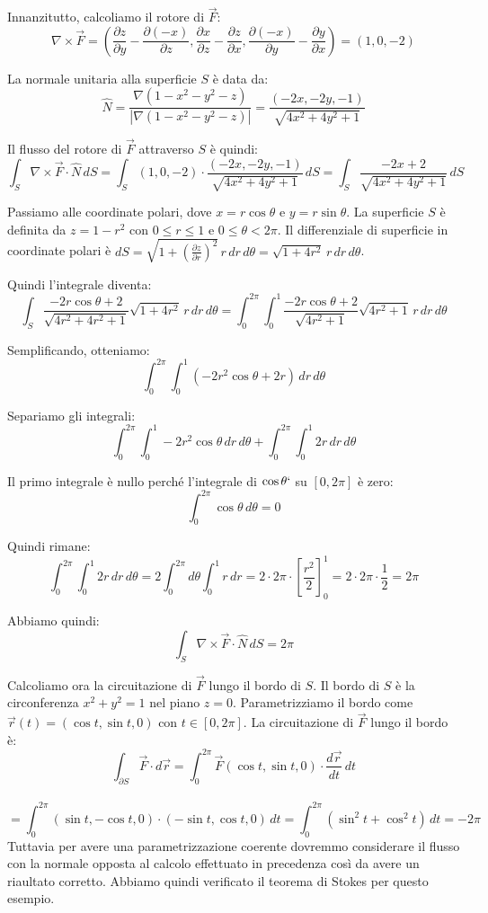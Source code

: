 Innanzitutto, calcoliamo il rotore di $\vec{F}$:
\[
\nabla \times \vec{F} = \left( \frac{\partial z}{\partial y} - \frac{\partial (-x)}{\partial z}, \frac{\partial x}{\partial z} - \frac{\partial z}{\partial x}, \frac{\partial (-x)}{\partial y} - \frac{\partial y}{\partial x} \right) = (1, 0, -2)
\]

La normale unitaria alla superficie $S$ è data da:
\[
\hat{N} = \frac{\nabla (1 - x^2 - y^2 - z)}{|\nabla (1 - x^2 - y^2 - z)|} = \frac{(-2x, -2y, -1)}{\sqrt{4x^2 + 4y^2 + 1}}
\]

Il flusso del rotore di $\vec{F}$ attraverso $S$ è quindi:
\[
\int_S \nabla \times \vec{F} \cdot \hat{N} \, dS = \int_S (1, 0, -2) \cdot \frac{(-2x, -2y, -1)}{\sqrt{4x^2 + 4y^2 + 1}} \, dS = \int_S \frac{-2x + 2}{\sqrt{4x^2 + 4y^2 + 1}} \, dS
\]

Passiamo alle coordinate polari, dove $x = r \cos \theta$ e $y = r \sin \theta$. La superficie $S$ è definita da $z = 1 - r^2$ con $0 \leq r \leq 1$ e $0 \leq \theta < 2\pi$. Il differenziale di superficie in coordinate polari è $dS = \sqrt{1 + (\frac{\partial z}{\partial r})^2} \, r \, dr \, d\theta = \sqrt{1 + 4r^2} \, r \, dr \, d\theta$.

Quindi l'integrale diventa:
\[
\int_S \frac{-2r \cos \theta + 2}{\sqrt{4r^2 + 4r^2 + 1}} \sqrt{1 + 4r^2} \, r \, dr \, d\theta = \int_0^{2\pi} \int_0^1 \frac{-2r \cos \theta + 2}{\sqrt{4r^2 + 1}} \sqrt{4r^2 + 1} \, r \, dr \, d\theta
\]

Semplificando, otteniamo:
\[
\int_0^{2\pi} \int_0^1 (-2r^2 \cos \theta + 2r) \, dr \, d\theta
\]

Separiamo gli integrali:
\[
\int_0^{2\pi} \int_0^1 -2r^2 \cos \theta \, dr \, d\theta + \int_0^{2\pi} \int_0^1 2r \, dr \, d\theta
\]

Il primo integrale è nullo perché l'integrale di $\cos \theta`$ su $[0, 2\pi]$ è zero:
\[
\int_0^{2\pi} \cos \theta \, d\theta = 0
\]

Quindi rimane:
\[
\int_0^{2\pi} \int_0^1 2r \, dr \, d\theta = 2 \int_0^{2\pi} d\theta \int_0^1 r \, dr = 2 \cdot 2\pi \cdot \left[ \frac{r^2}{2} \right]_0^1 = 2 \cdot 2\pi \cdot \frac{1}{2} = 2\pi
\]

Abbiamo quindi:
\[
\int_S \nabla \times \vec{F} \cdot \hat{N} \, dS = 2\pi
\]

Calcoliamo ora la circuitazione di $\vec{F}$ lungo il bordo di $S$. Il bordo di $S$ è la circonferenza $x^2 + y^2 = 1$ nel piano $z = 0$. Parametrizziamo il bordo come $\vec{r}(t) = (\cos t, \sin t, 0)$ con $t \in [0, 2\pi]$. La circuitazione di $\vec{F}$ lungo il bordo è:
\[
\int_{\partial S} \vec{F} \cdot d\vec{r} = \int_0^{2\pi} \vec{F}(\cos t, \sin t, 0) \cdot \frac{d\vec{r}}{dt} \, dt
\]
\\
\[= \int_0^{2\pi} (\sin t, -\cos t, 0) \cdot (-\sin t, \cos t, 0) \, dt = \int_0^{2\pi} (\sin^2 t + \cos^2 t) \, dt = -2\pi
\]
Tuttavia per avere una parametrizzazione coerente dovremmo considerare il flusso con la normale opposta al calcolo effettuato in precedenza così da avere un riaultato corretto.
Abbiamo quindi verificato il teorema di Stokes per questo esempio.


